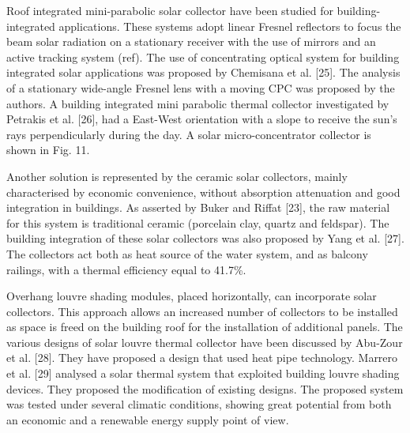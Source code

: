 Roof integrated mini-parabolic solar collector have been studied for building-integrated applications. These systems adopt linear Fresnel reflectors to focus the beam solar radiation on a stationary receiver with the use of mirrors and an active tracking system (ref). The use of concentrating optical system for building integrated solar applications was proposed by Chemisana et al. [25]. The analysis of a stationary wide-angle Fresnel lens with a moving CPC was proposed by the authors. A building integrated mini parabolic thermal collector investigated by Petrakis et al. [26], had a East-West orientation with a slope to receive the sun's rays perpendicularly during the day. A solar micro-concentrator collector is shown in Fig. 11.

Another solution is represented by the ceramic solar collectors, mainly characterised by economic convenience, without absorption attenuation and good integration in buildings. As asserted by Buker and Riffat [23], the raw material for this system is traditional ceramic (porcelain clay, quartz and feldspar). The building integration of these solar collectors was also proposed by Yang et al. [27]. The collectors act both as heat source of the water system, and as balcony railings, with a thermal efficiency equal to 41.7\%.

Overhang louvre shading modules, placed horizontally, can incorporate solar collectors. This approach allows an increased number of collectors to be installed as space is freed on the building roof for the installation of additional panels. The various designs of solar louvre thermal collector have been discussed by Abu-Zour et al. [28]. They have proposed a design that used heat pipe technology. Marrero et al. [29] analysed a solar thermal system that exploited building louvre shading devices. They proposed the modification of existing designs. The proposed system was tested under several climatic conditions, showing great potential from both an economic and a renewable energy supply point of view.








